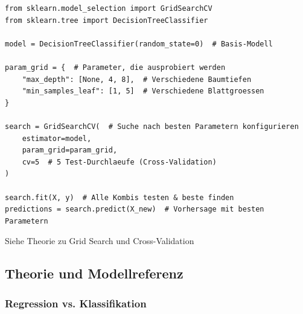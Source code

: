 \begin{codebox}
\begin{lstlisting}[style=CodeExpert]
from sklearn.model_selection import GridSearchCV
from sklearn.tree import DecisionTreeClassifier

model = DecisionTreeClassifier(random_state=0)  # Basis-Modell

param_grid = {  # Parameter, die ausprobiert werden
    "max_depth": [None, 4, 8],  # Verschiedene Baumtiefen
    "min_samples_leaf": [1, 5]  # Verschiedene Blattgroessen
}

search = GridSearchCV(  # Suche nach besten Parametern konfigurieren
    estimator=model,
    param_grid=param_grid,
    cv=5  # 5 Test-Durchlaeufe (Cross-Validation)
)

search.fit(X, y)  # Alle Kombis testen & beste finden
predictions = search.predict(X_new)  # Vorhersage mit besten Parametern
\end{lstlisting}
\end{codebox}

Siehe Theorie zu Grid Search und Cross-Validation 


\ZSFmanualColumnBreak
\subsection{Theorie und Modellreferenz}\label{sec:09-theorie}

\subsubsection{Regression vs. Klassifikation}\label{sec:09-ml-typen}

\begin{factlist}
\end{factlist}

